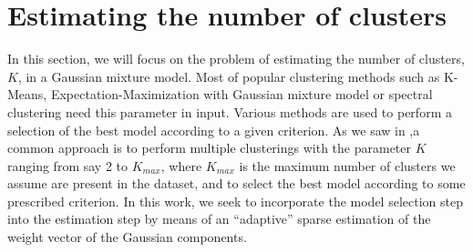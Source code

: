 \section{Estimating the number of clusters}
\label{estim_nb_clusters_sect}

In this section, we will focus on the problem of estimating the number of clusters, $K$, in a Gaussian mixture model. Most of popular clustering methods such as K-Means, Expectation-Maximization with Gaussian mixture model or spectral clustering need this parameter in input. Various methods are used to perform a selection of the best model according to a given criterion. As we saw in ,a common approach is to perform multiple clusterings with the parameter $K$ ranging from say 2 to $K_{max}$, where $K_{max}$ is the maximum number of clusters we assume are present in the dataset, and to select the best model according to some prescribed criterion. In this work, we seek to incorporate the model selection step into the estimation step by means of an ``adaptive'' sparse estimation of the weight vector of the Gaussian components.

